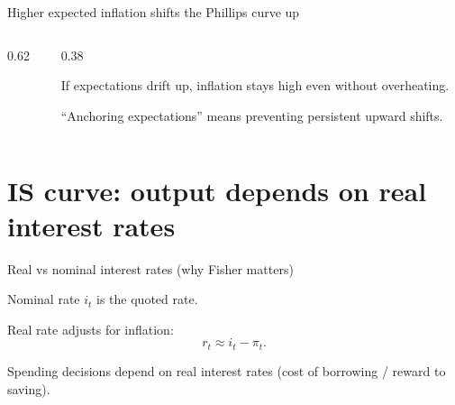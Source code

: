 \documentclass[aspectratio=169,xcolor=dvipsnames]{beamer}
\let\tempone\itemize
\let\temptwo\enditemize
\renewenvironment{itemize}{\tempone\addtolength{\itemsep}{\fill}}{\temptwo}
\newcommand{\axes}[4]{%
  \draw[axis] (#1,0) -- (#2,0);
  \draw[axis] (0,#3) -- (0,#4);
}
\newcommand{\xlabel}[1]{\node[below right] at (2.75,0) {#1};}
\newcommand{\ylabel}[1]{\node[above left] at (0,3.95) {#1};}
\begin{document}
\begin{frame}{Higher expected inflation shifts the Phillips curve up}
\begin{columns}
\begin{column}{0.62\textwidth}
\centering
{}
\end{column}
\begin{column}{0.38\textwidth}
\small
\begin{itemize}
\item If expectations drift up, inflation stays high even without overheating.
\item ``Anchoring expectations'' means preventing persistent upward shifts.
\end{itemize}
\end{column}
\end{columns}
\end{frame}

\section{IS curve: output depends on real interest rates}

\begin{frame}{Real vs nominal interest rates (why Fisher matters)}
\begin{itemize}
\item Nominal rate $i_t$ is the quoted rate.
\item Real rate adjusts for inflation:
\[
r_t \approx i_t-\pi_t.
\]
\item Spending decisions depend on real interest rates (cost of borrowing / reward to saving).
\end{itemize}
\end{frame}
\end{document}
